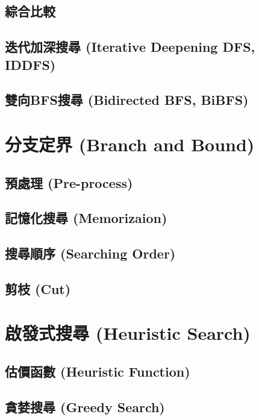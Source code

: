 \documentclass[12pt,a4paper,oneside]{report}
\begin{document}
\begin{CJK}{UTF8}{bkai}
\subsection{綜合比較}
\subsection{迭代加深搜尋 (Iterative Deepening DFS, IDDFS)}
\subsection{雙向BFS搜尋 (Bidirected BFS, BiBFS)}
\section{分支定界 (Branch and Bound)}
\subsection{預處理 (Pre-process)}
\subsection{記憶化搜尋 (Memorizaion)}
\subsection{搜尋順序 (Searching Order)}
\subsection{剪枝 (Cut)}
\section{啟發式搜尋 (Heuristic Search)}
\subsection{估價函數 (Heuristic Function)}
\subsection{貪婪搜尋 (Greedy Search)}

\ifx \allfiles \undefined

\printindex[noun]
\clearpage

\end{CJK}
\end{document}
